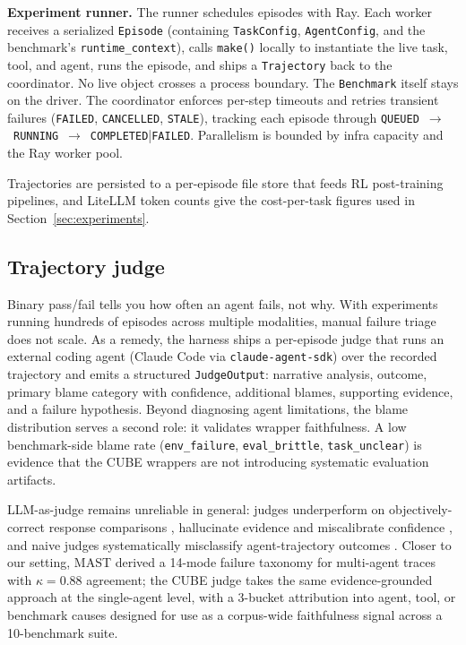 \documentclass{article}
\newcommand{\NUMCUBES}{10}            %
\newcommand{\mypar}[1]{\par\noindent\textbf{#1}\enspace}
\begin{document}
\mypar{Experiment runner.}
The runner schedules episodes with Ray. Each worker receives a serialized \texttt{Episode} (containing \texttt{TaskConfig}, \texttt{AgentConfig}, and the benchmark's \texttt{runtime\_context}), calls \texttt{make()} locally to instantiate the live task, tool, and agent, runs the episode, and ships a \texttt{Trajectory} back to the coordinator.
No live object crosses a process boundary.
The \texttt{Benchmark} itself stays on the driver.
The coordinator enforces per-step timeouts and retries transient failures (\texttt{FAILED}, \texttt{CANCELLED}, \texttt{STALE}), tracking each episode through \texttt{QUEUED}~$\to$~\texttt{RUNNING}~$\to$~\texttt{COMPLETED}|\texttt{FAILED}.
Parallelism is bounded by infra capacity and the Ray worker pool.

Trajectories are persisted to a per-episode file store that feeds RL
post-training pipelines, and LiteLLM token counts give the cost-per-task
figures used in Section~\ref{sec:experiments}.

\subsection{Trajectory judge}
\label{sec:judge}

Binary pass/fail tells you how often an agent fails, not why. With
experiments running hundreds of episodes across multiple modalities, manual
failure triage does not scale. As a remedy, the harness ships a per-episode judge that
runs an external coding agent (Claude Code via \texttt{claude-agent-sdk})
over the recorded trajectory and emits a structured \texttt{JudgeOutput}:
narrative analysis, outcome, primary blame category with confidence,
additional blames, supporting evidence, and a failure hypothesis.
Beyond diagnosing agent limitations, the blame distribution serves a second
role: it validates wrapper faithfulness. A low benchmark-side blame rate
(\texttt{env\_failure}, \texttt{eval\_brittle}, \texttt{task\_unclear})
is evidence that the CUBE wrappers are not introducing systematic
evaluation artifacts.

LLM-as-judge \citep{zheng2023judging,li2024llmjudgesurvey} remains
unreliable in general: judges underperform on objectively-correct
response comparisons \citep{tan2025judgebench}, hallucinate evidence
and miscalibrate confidence \citep{jung2025trustorescalate}, and
naive judges systematically misclassify agent-trajectory outcomes
\citep{lu2025agentrewardbench}. Closer to our setting, MAST \citep{cemri2025mast} derived a
14-mode failure taxonomy for multi-agent traces with
$\kappa{=}0.88$ agreement; the CUBE judge takes the same
evidence-grounded approach at the single-agent level, with a
3-bucket attribution into agent, tool, or benchmark causes designed
for use as a corpus-wide faithfulness signal across a
\NUMCUBES{}-benchmark suite.
\end{document}
